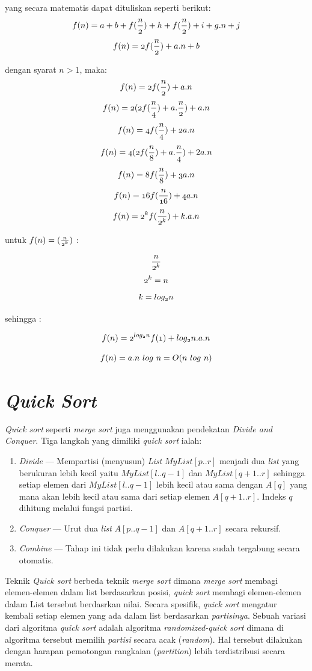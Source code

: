 yang secara matematis dapat dituliskan seperti berikut:
$$	  \mathnormal{f(n) = a+b+f(\frac{n}{2})+h+f(\frac{n}{2})+i+g.n+j } $$
$$	  \mathnormal{f(n) = 2f(\frac{n}{2})+a.n + b} $$

dengan syarat $n > 1$, maka:
$$	  \mathnormal{f(n) = 2f(\frac{n}{2})+a.n } $$
$$	  \mathnormal{f(n) = 2(2f(\frac{n}{4})+a.\frac{n}{2} )} + a.n $$
$$	  \mathnormal{f(n) = 4f(\frac{n}{4})+2a.n } $$
$$	  \mathnormal{f(n) = 4(2f(\frac{n}{8})+a.\frac{n}{4} )}+2a.n $$
$$	  \mathnormal{f(n) = 8f(\frac{n}{8})+3a.n } $$
$$	  \mathnormal{f(n) = 16f(\frac{n}{16})+4a.n } $$
$$	  \mathnormal{f(n) = 2^{k}f(\frac{n}{2^{k}})+k.a.n } $$

untuk $ \mathnormal{f(n) = (\frac{n}{2^{k}})} $ :

$$ \mathnormal{\frac{n}{2^{k}}} $$
$$ \mathnormal{2^{k}=n} $$
$$ \mathnormal{k=log_{2}n} $$

sehingga :

$$	  \mathnormal{f(n) = 2^{log_{2}n}f(1)+log_{2}n.a.n } $$

$$	  \mathnormal{f(n) = a.n\ log\ n = O(n\ log\ n)} $$
 
\section{\textit{Quick Sort}}

\textit{Quick sort} seperti \textit{merge sort} juga menggunakan pendekatan \textit{Divide and Conquer}. Tiga langkah yang dimiliki \textit{quick sort} ialah:
\begin{enumerate}
	\item \textit{Divide} --- Mempartisi (menyusun) \textit{List} $MyList[p..r]$ menjadi dua \textit{list} yang berukuran lebih kecil yaitu $MyList[l..q-1]$ dan $MyList[q+1..r]$ sehingga setiap elemen dari $MyList[l..q-1]$ lebih kecil atau sama dengan $A[q]$ yang mana akan lebih kecil atau sama dari setiap elemen $A[q+1..r]$. Indeks $q$ dihitung melalui fungsi partisi.
	\item \textit{Conquer} --- Urut dua \textit{list} $A[p..q-1]$ dan $A[q+1..r]$ secara rekursif.
	\item \textit{Combine} --- Tahap ini tidak perlu dilakukan karena sudah tergabung secara otomatis.
\end{enumerate}

Teknik \textit{Quick sort} berbeda teknik \textit{merge sort} dimana \textit{merge sort} membagi elemen-elemen dalam list berdasarkan posisi, \textit{quick sort} membagi elemen-elemen dalam List tersebut berdasrkan nilai. Secara spesifik, \textit{quick sort} mengatur kembali setiap elemen yang ada dalam list berdasarkan \emph{partisinya}. Sebuah variasi dari algoritma \textit{quick sort} adalah algoritma \textit{randomized-quick sort} dimana di algoritma tersebut memilih \textit{partisi} secara acak (\textit{random}). Hal tersebut dilakukan dengan harapan pemotongan rangkaian (\textit{partition}) lebih terdistribusi secara merata.

